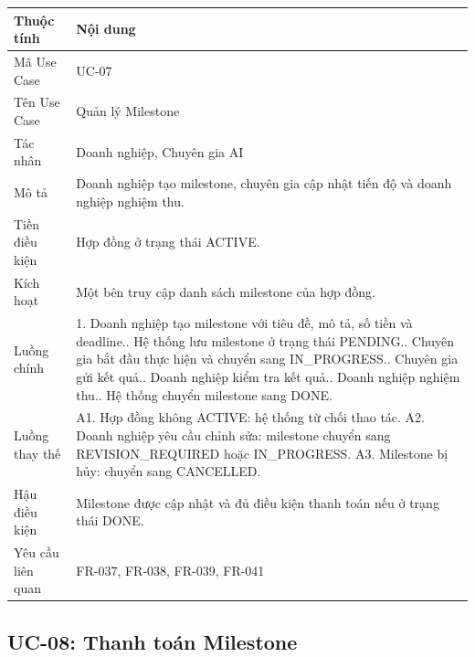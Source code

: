 \begin{longtable}{|p{3.5cm}|p{10.2cm}|}
\hline
\textbf{Thuộc tính} & \textbf{Nội dung} \\ \hline
Mã Use Case & UC-07 \\ \hline
Tên Use Case & Quản lý Milestone \\ \hline
Tác nhân & Doanh nghiệp, Chuyên gia AI \\ \hline
Mô tả & Doanh nghiệp tạo milestone, chuyên gia cập nhật tiến độ và doanh nghiệp nghiệm thu. \\ \hline
Tiền điều kiện & Hợp đồng ở trạng thái ACTIVE. \\ \hline
Kích hoạt & Một bên truy cập danh sách milestone của hợp đồng. \\ \hline
Luồng chính &
1. Doanh nghiệp tạo milestone với tiêu đề, mô tả, số tiền và deadline.\newline
2. Hệ thống lưu milestone ở trạng thái PENDING.\newline
3. Chuyên gia bắt đầu thực hiện và chuyển sang IN\_PROGRESS.\newline
4. Chuyên gia gửi kết quả.\newline
5. Doanh nghiệp kiểm tra kết quả.\newline
6. Doanh nghiệp nghiệm thu.\newline
7. Hệ thống chuyển milestone sang DONE. \\ \hline
Luồng thay thế &
A1. Hợp đồng không ACTIVE: hệ thống từ chối thao tác.\newline
A2. Doanh nghiệp yêu cầu chỉnh sửa: milestone chuyển sang REVISION\_REQUIRED hoặc IN\_PROGRESS.\newline
A3. Milestone bị hủy: chuyển sang CANCELLED. \\ \hline
Hậu điều kiện & Milestone được cập nhật và đủ điều kiện thanh toán nếu ở trạng thái DONE. \\ \hline
Yêu cầu liên quan & FR-037, FR-038, FR-039, FR-041 \\ \hline
\end{longtable}

\subsection{UC-08: Thanh toán Milestone}

